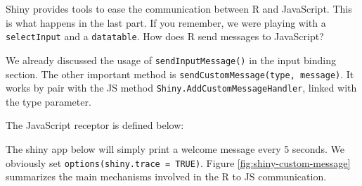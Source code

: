 \documentclass[
]{book}
\newenvironment{Shaded}{\begin{snugshade}}{\end{snugshade}}
\newcommand{\AttributeTok}[1]{\textcolor[rgb]{0.77,0.63,0.00}{#1}}
\newcommand{\ControlFlowTok}[1]{\textcolor[rgb]{0.13,0.29,0.53}{\textbf{#1}}}
\newcommand{\DataTypeTok}[1]{\textcolor[rgb]{0.13,0.29,0.53}{#1}}
\newcommand{\KeywordTok}[1]{\textcolor[rgb]{0.13,0.29,0.53}{\textbf{#1}}}
\newcommand{\NormalTok}[1]{#1}
\newcommand{\OperatorTok}[1]{\textcolor[rgb]{0.81,0.36,0.00}{\textbf{#1}}}
\newcommand{\SpecialCharTok}[1]{\textcolor[rgb]{0.00,0.00,0.00}{#1}}
\newcommand{\StringTok}[1]{\textcolor[rgb]{0.31,0.60,0.02}{#1}}
\newcommand{\VariableTok}[1]{\textcolor[rgb]{0.00,0.00,0.00}{#1}}
\newcommand{\VerbatimStringTok}[1]{\textcolor[rgb]{0.31,0.60,0.02}{#1}}
\begin{document}
Shiny provides tools to ease the communication between R and JavaScript. This is what happens in the last part. If you remember, we were playing with a \texttt{selectInput} and a \texttt{datatable}. How does R send messages to JavaScript?

We already discussed the usage of \texttt{sendInputMessage()} in the input binding section. The other important method is \texttt{sendCustomMessage(type,\ message)}. It works by pair with the JS method \texttt{Shiny.AddCustomMessageHandler}, linked with the type parameter.

\begin{Shaded}
\end{Shaded}

The JavaScript receptor is defined below:

\begin{Shaded}
\end{Shaded}

The shiny app below will simply print a welcome message every 5 seconds. We obviously set \texttt{options(shiny.trace\ =\ TRUE)}. Figure \ref{fig:shiny-custom-message} summarizes the main mechanisms involved in the R to JS communication.
\end{document}
